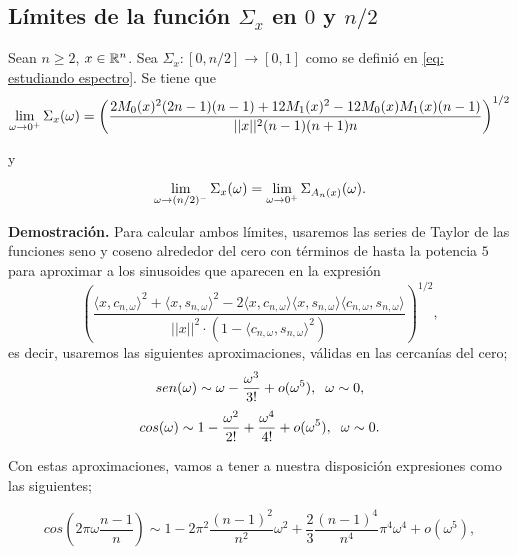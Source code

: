 \subsection{Límites de la función $\Sigma_{x}$ en $0$ y $n/2$}

\begin{teo}
\label{teo: limite del espectro por cero}
Sean $n \geq 2$, $x \in \mathbb{R}^{n}$.
Sea $\Sigma_{x}: [0, n/2] \rightarrow [0,1]$ 
como se definió en \eqref{eq: estudiando espectro}.
Se tiene que 
\begin{equation}
\label{eq: limite del espectro a cero}
\lim\limits_{\omega \rightarrow 0^{+}}{\Sigma_{x}(\omega)}
=
\left(
\frac{
2M_{0}(x)^{2}(2n-1)(n-1) + 12M_{1}(x)^{2} - 12M_{0}(x)M_{1}(x)(n-1)
}{
||x||^{2} (n-1)(n+1)n}
\right)^{1/2}
\end{equation}

y

\begin{equation}
\label{eq: limite del espectro a n medios}
\lim\limits_{\omega \rightarrow (n/2)^{-}}{\Sigma_{x}(\omega)}
= \lim\limits_{\omega \rightarrow 0^{+}}{\Sigma_{A_{n}(x)}(\omega)}.
\end{equation}
\end{teo}
\noindent
\textbf{Demostración.}
Para calcular ambos límites, 
usaremos las series de Taylor
de las funciones seno y coseno alrededor del cero
con términos de hasta la potencia $5$ para aproximar
a los sinusoides que aparecen en la expresión 
\begin{equation}
\label{eq1: 22May}
\left(		  
		  \frac{\langle x, c_{n, \omega } \rangle^{2} +  \langle x, s_{n, \omega } \rangle^{2}	
	       -2  \langle x, c_{n, \omega } \rangle \langle x, s_{n, \omega } \rangle \langle c_{n, \omega }, s_{n, \omega } \rangle}{ || x ||^{2} \cdot
	       (1- \langle c_{n, \omega }, s_{n, \omega } \rangle^{2})}	  
\right) ^{1/2},
\end{equation}
es decir, usaremos
las siguientes aproximaciones, válidas en las cercanías
del cero;
\[
sen(\omega) 
\sim
\omega - \frac{\omega^{3}}{3!}
+ o(\omega^{5}),
\hspace{0.2cm} \omega \sim 0,
\]
\[
cos(\omega) \sim 1 - \frac{\omega^{2}}{2!}
+ \frac{\omega^{4}}{4!} + o(\omega^{5}),
\hspace{0.2cm} \omega \sim 0.
\]

Con estas aproximaciones, vamos a tener
a nuestra disposición expresiones como las siguientes;

\[
cos\left(
2 \pi \omega \frac{n-1}{n}\right) \sim
1-2\pi^{2}\frac{(n-1)^{2}}{n^{2}} \omega^{2}
+\frac{2}{3} \frac{(n-1)^{4}}{n^{4}} \pi^{4} \omega^{4}
+ o(\omega^{5}),
\]

